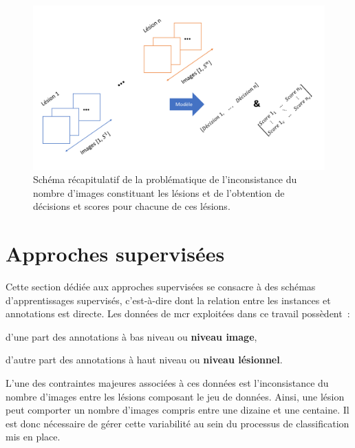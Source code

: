 \begin{figure}[H]
    \centering
    \includegraphics[width=0.6\linewidth]{contents/chapter_7/resources/scheme_patient_decision_objectives.pdf}
    \caption{Schéma récapitulatif de la problématique de l'inconsistance du nombre d'images constituant les lésions et de l'obtention de décisions et scores pour chacune de ces lésions.}
    \label{fig:scheme_patient_decision_objectives}
\end{figure}\par
\clearpage

\section{Approches supervisées}
\label{sec:patient_decision_supervised}
Cette section dédiée aux approches supervisées se consacre à des schémas d'apprentissages supervisés, c'est-à-dire dont la relation entre les instances et annotations est directe. Les données de \gls{mcr} exploitées dans ce travail possèdent~:
\begin{inlinerate}
    \item d'une part des annotations à bas niveau ou \textbf{niveau image},
    \item d'autre part des annotations à haut niveau ou \textbf{niveau lésionnel}. 
\end{inlinerate} L'une des contraintes majeures associées à ces données est l'inconsistance du nombre d'images entre les lésions composant le jeu de données. Ainsi, une lésion peut comporter un nombre d'images compris entre une dizaine et une centaine. Il est donc nécessaire de gérer cette variabilité au sein du processus de classification mis en place.\par

